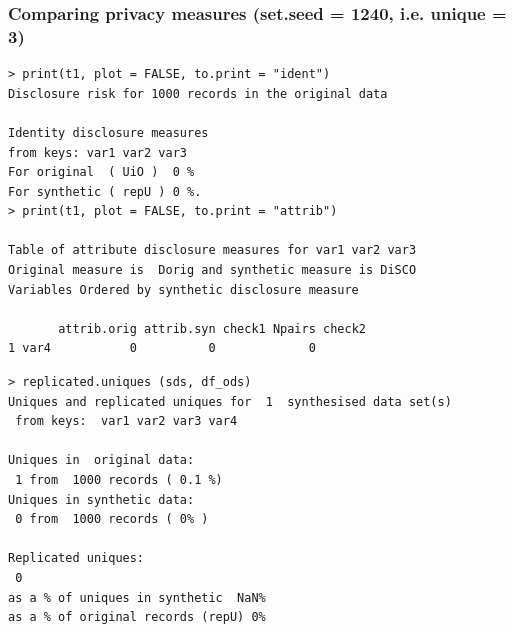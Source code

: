 \documentclass[t,8pt,utfx8]{beamer}
\begin{document}
\begin{spacing}{1.25}
\begin{frame}[fragile]
\frametitle{Comparing privacy measures (set.seed = 1240, i.e. unique = 3)}
  


\begin{minipage}[t]{0.48\textwidth}
\begin{lstlisting}
> print(t1, plot = FALSE, to.print = "ident")
Disclosure risk for 1000 records in the original data

Identity disclosure measures
from keys: var1 var2 var3 
For original  ( UiO )  0 %
For synthetic ( repU ) 0 %.
> print(t1, plot = FALSE, to.print = "attrib")

Table of attribute disclosure measures for var1 var2 var3 
Original measure is  Dorig and synthetic measure is DiSCO 
Variables Ordered by synthetic disclosure measure

       attrib.orig attrib.syn check1 Npairs check2
1 var4           0          0             0       
\end{lstlisting}
\end{minipage}%
  \hfill%
\begin{minipage}[t]{0.48\textwidth}
\begin{lstlisting}
> replicated.uniques (sds, df_ods)
Uniques and replicated uniques for  1  synthesised data set(s)
 from keys:  var1 var2 var3 var4 

Uniques in  original data:
 1 from  1000 records ( 0.1 %) 
Uniques in synthetic data:
 0 from  1000 records ( 0% )

Replicated uniques:
 0
as a % of uniques in synthetic  NaN%
as a % of original records (repU) 0%
\end{lstlisting}
\end{minipage}
\end{frame}




\end{spacing}
\end{document}
